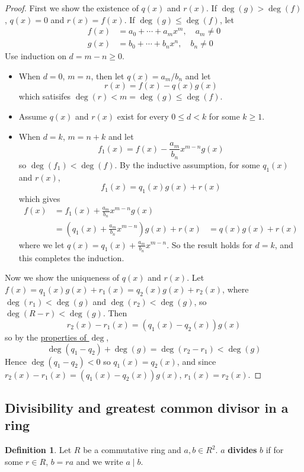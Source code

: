 \documentclass[12pt,a4paper]{article}
\theoremstyle{definition}
\newtheorem{definition}{Definition}[subsection]
\begin{document}
\begin{proof}
	First we show the existence of $q(x)$ and $r(x)$. If $\deg(g) > \deg(f)$, $q(x) = 0$ and $r(x) = f(x)$. If $\deg(g) \le \deg(f)$, let
	\[
		\begin{aligned}
			f(x) & = a_0 + \cdots + a_m x^m, \quad a_m \ne 0 \\
			g(x) & = b_0 + \cdots + b_n x^n, \quad b_n \ne 0
		\end{aligned}
	\]
	Use induction on $d = m - n \ge 0$.
	\begin{itemize}
		\item When $d = 0$, $m = n$, then let $q(x) = a_m / b_n$ and let
		\[
			r(x) = f(x) - q(x) g(x)
		\]
		which satisifes $\deg(r) < m = \deg(g) \le \deg(f)$.
		\item Assume $q(x)$ and $r(x)$ exist for every $0 \le d < k$ for some $k \ge 1$.
		\item When $d = k$, $m = n + k$ and let
		\[
			f_1(x) = f(x) - \frac{a_m}{b_n} x^{m - n} g(x)
		\]
		so $\deg(f_1) < \deg(f)$. By the inductive assumption, for some $q_1(x)$ and $r(x)$,
		\[
			f_1(x) = q_1(x) g(x) + r(x)
		\]
		which gives
		\[
			\begin{aligned}
				f(x)
					& = f_1(x) + \frac{a_m}{b_n} x^{m - n} g(x) \\
					& = \left( q_1(x) + \frac{a_m}{b_n} x^{m - n} \right) g(x) + r(x)
					& = q(x) g(x) + r(x)
			\end{aligned}
		\]
		where we let $q(x) = q_1(x) + \frac{a_m}{b_n} x^{m - n}$. So the result holds for $d = k$, and this completes the induction.
	\end{itemize}
	Now we show the uniqueness of $q(x)$ and $r(x)$. Let $f(x) = q_1(x) g(x) + r_1(x) = q_2(x) g(x) + r_2(x)$, where $\deg(r_1) < \deg(g)$ and $\deg(r_2) < \deg(g)$, so $\deg(R - r) < \deg(g)$. Then
	\[
		r_2(x) - r_1(x) = (q_1(x) - q_2(x)) g(x)
	\]
	so by the \hyperref[def:deg]{properties of $\deg$},
	\[
		\deg(q_1 - q_2) + \deg(g) = \deg(r_2 - r_1) < \deg(g)
	\]
	Hence $\deg(q_1 - q_2) < 0$ so $q_1(x) = q_2(x)$, and since $r_2(x) - r_1(x) = (q_1(x) - q_2(x)) g(x)$, $r_1(x) = r_2(x)$.
\end{proof}

\subsection{Divisibility and greatest common divisor in a ring}

\begin{definition}
	Let $R$ be a commutative ring and $a, b \in R^2$. $a$ \textbf{divides} $b$ if for some $r \in R$, $b = ra$ and we write $a \mid b$.
\end{definition}
\end{document}
